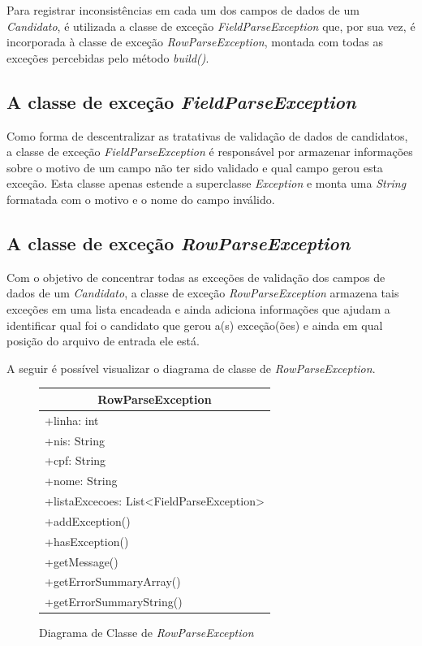 \documentclass[
	12pt,			%
	openright,		%
	oneside,	
	a4paper,		%
	english,		%
	brazil			%
]{abntex2/abntex2}  %
\begin{document}
				Para registrar inconsistências em cada um dos campos de dados de um \textit{Candidato}, é utilizada a classe de exceção \textit{FieldParseException} que, por sua vez, é incorporada à classe de exceção \textit{RowParseException}, montada com todas as exceções percebidas pelo método \textit{build()}.

			\subsection{A classe de exceção \textit{FieldParseException}}
	
				Como forma de descentralizar as tratativas de validação de dados de candidatos, a classe de exceção \textit{FieldParseException} é responsável por armazenar informações sobre o motivo de um campo não ter sido validado e qual campo gerou esta exceção. Esta classe apenas estende a superclasse \textit{Exception} e monta uma \textit{String} formatada com o motivo e o nome do campo inválido.

			\subsection{A classe de exceção \textit{RowParseException}}	

				Com o objetivo de concentrar todas as exceções de validação dos campos de dados de um \textit{Candidato}, a classe de exceção \textit{RowParseException} armazena tais exceções em uma lista encadeada e ainda adiciona informações que ajudam a identificar qual foi o candidato que gerou a(s) exceção(ões) e ainda em qual posição do arquivo de entrada ele está.
	
				A seguir é possível visualizar o diagrama de classe de \textit{RowParseException}.
	
				\begin{figure}[h]
					\begin{center}
						
						\caption{Diagrama de Classe de \textit{RowParseException}}
						\label{rowparseexception-uml}
			
						\begin{tabular}{|l|}
							\hline
							\multicolumn{1}{|c|}{\textbf{RowParseException}} \\ \hline
							+linha: int \\
							+nis: String \\
							+cpf: String \\
							+nome: String \\
							+listaExcecoes: List\textless{}FieldParseException\textgreater{} \\ \hline
							+addException() \\
							+hasException() \\
							+getMessage() \\
							+getErrorSummaryArray() \\
							+getErrorSummaryString() \\ \hline
						\end{tabular}
						
					\end{center}
				\end{figure}
\end{document}
